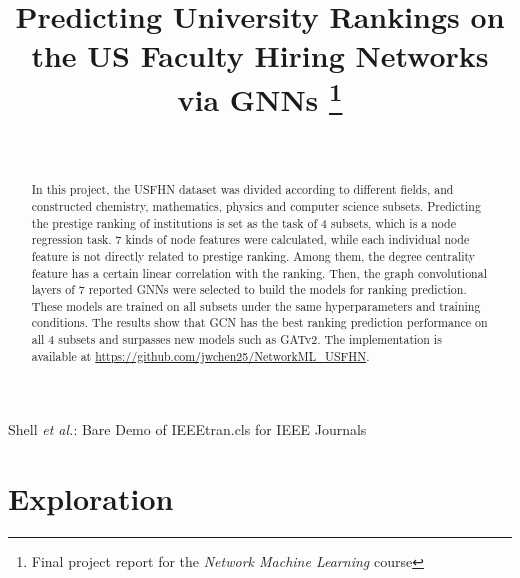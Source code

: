\documentclass[journal]{IEEEtran}
\begin{document}
\title{Predicting University Rankings on the US Faculty Hiring Networks via GNNs
\thanks{Final project report for the \textit{Network Machine Learning} course}
}

\author{ \\
}

%
{Shell \MakeLowercase{\textit{et al.}}: Bare Demo of IEEEtran.cls for IEEE Journals}

\maketitle

\begin{abstract}
In this project, the USFHN dataset was divided according to different fields, and constructed chemistry, mathematics, physics and computer science subsets. Predicting the prestige ranking of institutions is set as the task of 4 subsets, which is a node regression task. 7 kinds of node features were calculated, while each individual node feature is not directly related to prestige ranking. Among them, the degree centrality feature has a certain linear correlation with the ranking. Then, the graph convolutional layers of 7 reported GNNs were selected to build the models for ranking prediction. These models are trained on all subsets under the same hyperparameters and training conditions. The results show that GCN has the best ranking prediction performance on all 4 subsets and surpasses new models such as GATv2. The implementation is available at \href{https://github.com/jwchen25/NetworkML_USFHN}{https://github.com/jwchen25/NetworkML\_USFHN}.
\end{abstract}

\section{Exploration}
\end{document}

